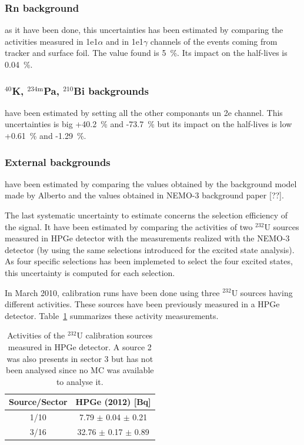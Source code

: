 \documentclass[main.tex]{subfiles}
\begin{document}
\subsubsection{Rn background}


as it have been done, this uncertainties has been estimated by comparing the activities measured in 1e1$\alpha$ and in 1e1$\gamma$ channels of the events coming from tracker and surface foil. The value found is 5~\%. Its impact on the half-lives is 0.04~\%.


\subsubsection{$^{\text{40}}$K, $^{\text{234m}}$Pa, $^{\text{210}}$Bi backgrounds}


have been estimated by setting all the other componants un 2e channel. This uncertainties is big +40.2~\% and -73.7~\% but its impact on the half-lives is low +0.61~\% and -1.29~\%.


\subsubsection{External backgrounds}


 have been estimated by comparing the values obtained by the background model made by Alberto and the values obtained in NEMO-3 background paper [??].


\NI The last systematic uncertainty to estimate concerns the selection efficiency of the signal. It have been estimated by comparing the activities of two $^{\text{232}}$U sources measured in HPGe detector with the measurements realized with the NEMO-3 detector (by using the same selections introduced for the excited state analysis). As four specific selections has been implemeted to select the four excited states, this uncertainty is computed for each selection.


\bigskip


\NI In March 2010, calibration runs have been done using three $^{\text{232}}$U sources having different activities. These sources have been previously measured in a HPGe detector. Table~\ref{tab:HPGeMeasurementU232} summarizes these activity measurements. 


\begin{table}[h!]
\centering
\begin{tabular}{c|c}
Source/Sector & HPGe (2012) [Bq]   \\
\midrule
1/10          & 7.79  $\pm$ 0.04 $\pm$ 0.21 \\ 
3/16          & 32.76 $\pm$ 0.17 $\pm$ 0.89 \\ 
\bottomrule
\end{tabular}
\caption{Activities of the $^{\text{232}}$U calibration sources measured in HPGe detector. A source 2 was also presents in sector 3 but has not been analysed since no MC was available to analyse it.}
\label{tab:HPGeMeasurementU232}
\end{table}  
\end{document}
